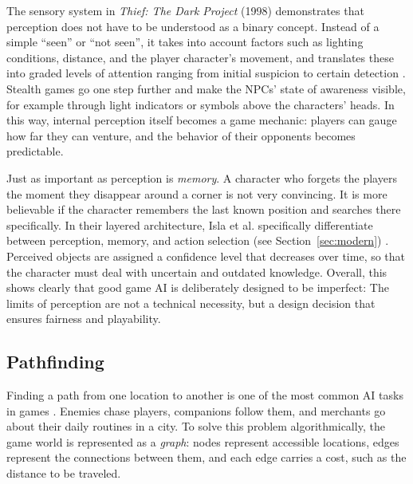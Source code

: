 The sensory system in \emph{Thief: The Dark Project} (1998) demonstrates that perception does not have to be understood as a binary concept. Instead of a simple \glqq “seen”\grqq{} or \glqq “not seen”\grqq{}, it takes into account factors such as lighting conditions, distance, and the player character’s movement, and translates these into graded levels of attention ranging from initial suspicion to certain detection \cite{leonard2003}. Stealth games go one step further and make the NPCs’ state of awareness visible, for example through light indicators or symbols above the characters’ heads. In this way, internal perception itself becomes a game mechanic: players can gauge how far they can venture, and the behavior of their opponents becomes predictable.


Just as important as perception is \emph{memory}. A character who forgets the players the moment they disappear around a corner is not very convincing. It is more believable if the character remembers the last known position and searches there specifically. In their layered architecture, Isla et al. specifically differentiate between perception, memory, and action selection (see Section~\ref{sec:modern}) \cite{isla2001}. Perceived objects are assigned a confidence level that decreases over time, so that the character must deal with uncertain and outdated knowledge. Overall, this shows clearly that good game AI is deliberately designed to be imperfect: The limits of perception are not a technical necessity, but a design decision that ensures fairness and playability.

\subsection{Pathfinding}

Finding a path from one location to another is one of the most common AI tasks in games \cite{millington2009,yannakakis2018}. Enemies chase players, companions follow them, and merchants go about their daily routines in a city. To solve this problem algorithmically, the game world is represented as a \emph{graph}: nodes represent accessible locations, edges represent the connections between them, and each edge carries a cost, such as the distance to be traveled.

